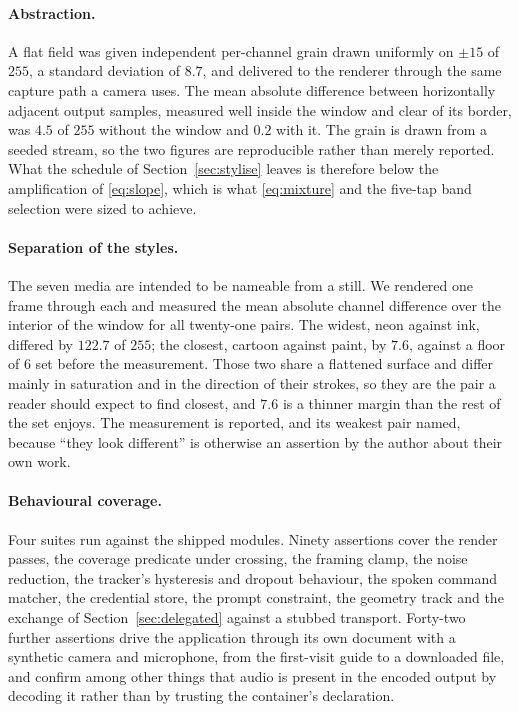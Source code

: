 \documentclass{article}
\theoremstyle{definition}
\begin{document}
\paragraph{Abstraction.}
A flat field was given independent per-channel grain drawn uniformly on
$\pm 15$ of $255$, a standard deviation of $8.7$, and delivered to the renderer
through the same capture path a camera uses. The mean absolute difference between
horizontally adjacent output samples, measured well inside the window and clear
of its border, was $4.5$ of $255$ without the window and $0.2$ with it. The grain
is drawn from a seeded stream, so the two figures are reproducible rather than
merely reported. What the schedule of Section~\ref{sec:stylise} leaves is
therefore below the amplification of \eqref{eq:slope}, which is what
\eqref{eq:mixture} and the five-tap band selection were sized to achieve.

\paragraph{Separation of the styles.}
The seven media are intended to be nameable from a still. We rendered one frame
through each and measured the mean absolute channel difference over the interior
of the window for all twenty-one pairs. The widest, neon against ink, differed by
$122.7$ of $255$; the closest, cartoon against paint, by $7.6$, against a floor of
$6$ set before the measurement. Those two share a flattened surface and differ
mainly in saturation and in the direction of their strokes, so they are the pair
a reader should expect to find closest, and $7.6$ is a thinner margin than the
rest of the set enjoys. The measurement is reported, and its weakest pair named,
because ``they look different'' is otherwise an assertion by the author about
their own work.

\paragraph{Behavioural coverage.}
Four suites run against the shipped modules. Ninety assertions cover the
render passes, the coverage predicate under crossing, the framing clamp, the
noise reduction, the tracker's hysteresis and dropout behaviour, the spoken
command matcher, the credential store, the prompt constraint, the geometry track
and the exchange of Section~\ref{sec:delegated} against a stubbed transport.
Forty-two further assertions drive the application through its own document with
a synthetic camera and microphone, from the first-visit guide to a downloaded
file, and confirm among other things that audio is present in the encoded output
by decoding it rather than by trusting the container's declaration.
\end{document}
